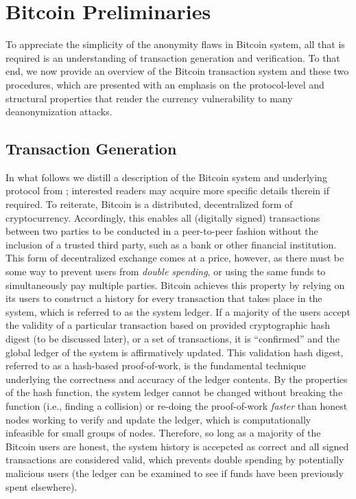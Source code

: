 \section{Bitcoin Preliminaries}

To appreciate the simplicity of the anonymity flaws in Bitcoin system, all that is required is an understanding of transaction generation and verification. To that end, we now provide an overview of the Bitcoin transaction system and these two procedures, which are presented with an emphasis on the protocol-level and structural properties that render the currency vulnerability to many deanonymization attacks.

\subsection{Transaction Generation}

In what follows we distill a description of the Bitcoin system and underlying protocol from \cite{bitcoin}; interested readers may acquire more specific details therein if required. To reiterate, Bitcoin is a distributed, decentralized form of cryptocurrency. Accordingly, this enables all (digitally signed) transactions between two parties to be conducted in a peer-to-peer fashion without the inclusion of a trusted third party, such as a bank or other financial institution. This form of decentralized exchange comes at a price, however, as there must be some way to prevent users from \emph{double spending}, or using the same funds to simultaneously pay multiple parties. Bitcoin achieves this property by relying on its users to construct a history for every transaction that takes place in the system, which is referred to as the system ledger. If a majority of the users accept the validity of a particular transaction based on provided cryptographic hash digest (to be discussed later), or a set of transactions, it is ``confirmed'' and the global ledger of the system is affirmatively updated. This validation hash digest, referred to as a hash-based proof-of-work, is the fundamental technique underlying the correctness and accuracy of the ledger contents. By the properties of the hash function, the system ledger cannot be changed without breaking the function (i.e., finding a collision) or re-doing the proof-of-work \emph{faster} than honest nodes working to verify and update the ledger, which is computationally infeasible for small groups of nodes. Therefore, so long as a majority of the Bitcoin users are honest, the system history is accepcted as correct and all signed transactions are considered valid, which prevents double spending by potentially malicious users (the ledger can be examined to see if funds have been previously spent elsewhere). 

